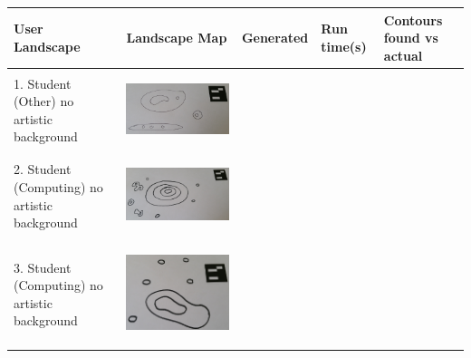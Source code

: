 \documentclass[11pt]{article}
\begin{document}
\newpage
\begin{landscape}
\begin{longtable}{p{}| p{}| p{} | p{} |p{}}
\hline
User Landscape 		& Landscape Map 			& Generated 	& Run time(s) & Contours found vs actual\\
\hline
1. Student (Other)
	no artistic background & \begin{center}\includegraphics[scale=0.5]{pics/usertesting/1.png}\end{center} 
							& \begin{center}\end{center} & \\
\hline
2. Student (Computing)
	no artistic background & \begin{center}\includegraphics[scale=0.5]{pics/usertesting/2.png}\end{center} 
							& \begin{center}\end{center} & \\
\hline
3. Student (Computing)
	no artistic background & \begin{center}\includegraphics[scale=0.5]{pics/usertesting/3.png}\end{center} 

\end{longtable}
\end{landscape}
\end{document}
